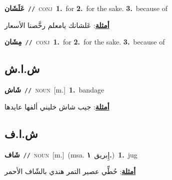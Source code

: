 \documentclass[10pt,a4paper,twoside]{article} %
\begin{document}
\begin{multicols}{2}
{{{\setlength\topsep{0pt}\textbf{\foreignlanguage{arabic}{عَلَشَان}}\ {\color{gray}\texttt{//}\color{black}}\ \textsc{conj}\ \textbf{1.}~for  \textbf{2.}~for the sake.  \textbf{3.}~because of\  \begin{flushright}\color{gray}\foreignlanguage{arabic}{\textbf{\underline{\foreignlanguage{arabic}{أمثلة}}}: عَلشانك يامعلم رخَّصنا الأسعار}\end{flushright}\color{black}} \vspace{2mm}

{\setlength\topsep{0pt}\textbf{\foreignlanguage{arabic}{مِشَان}}\ {\color{gray}\texttt{//}\color{black}}\ \textsc{conj}\ \textbf{1.}~for  \textbf{2.}~for the sake.  \textbf{3.}~because of\ 

\vspace{-3mm}
\subsection*{\color{blue}\foreignlanguage{arabic}{ش.ا.ش}\color{blue}{ (ntws)}} 

{\setlength\topsep{0pt}\textbf{\foreignlanguage{arabic}{شَاش}}\ {\color{gray}\texttt{//}\color{black}}\ \textsc{noun}\ [m.]\ \textbf{1.}~bandage\  \begin{flushright}\color{gray}\foreignlanguage{arabic}{\textbf{\underline{\foreignlanguage{arabic}{أمثلة}}}: جيب شاش خليني ألفها عايدها}\end{flushright}\color{black}} \vspace{2mm}

\vspace{-3mm}
\subsection*{\color{blue}\foreignlanguage{arabic}{ش.ا.ف}\color{blue}{ (ntws)}} 

{\setlength\topsep{0pt}\textbf{\foreignlanguage{arabic}{شَاف}}\ {\color{gray}\texttt{//}\color{black}}\ \textsc{noun}\ [m.]\ \color{gray}(msa. \foreignlanguage{arabic}{إِبريق}~\foreignlanguage{arabic}{\textbf{١.}})\color{black}\ \textbf{1.}~jug\  \begin{flushright}\color{gray}\foreignlanguage{arabic}{\textbf{\underline{\foreignlanguage{arabic}{أمثلة}}}: حُطِّي عصير التمر هندي بالشّاف الأحمر}\end{flushright}\color{black}} \vspace{2mm}

}}}
\end{multicols}
\end{document}
